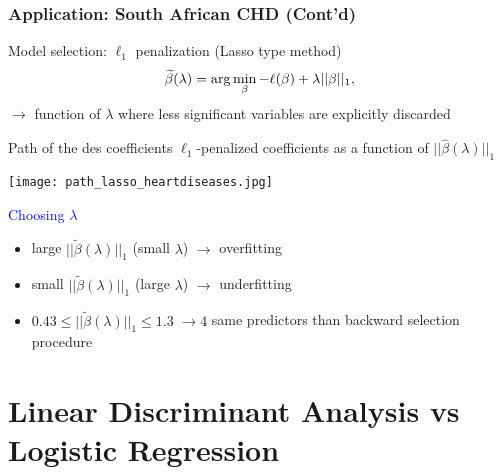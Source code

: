 \documentclass[compress, smaller, serif, 9pt]{beamer}
\begin{document}
\begin{frame}
  \frametitle{Application:  South African CHD (Cont'd)}
\begin{block}{Model selection: $\ell_1$ penalization (Lasso type method)}
\vspace{-3mm}
$$
\widetilde{\beta}(\lambda) = \arg \min_{\beta} - \ell(\beta) + \lambda || \beta ||_{1},
\vspace{-2mm}
$$
$\rightarrow$ function of $\lambda$ where less significant variables are explicitly discarded
\end{block}
\vspace{-1mm}
\begin{block}{Path of the  des coefficients $\ell_1$-penalized coefficients as a function of
$|| \hat{\beta}(\lambda) ||_{1}$}
\begin{minipage}{.65\textwidth}
\begin{center}
\texttt{[image: path\_lasso\_heartdiseases.jpg]}
\end{center}
\end{minipage}
\begin{minipage}{.33\textwidth}
\small
\textcolor{blue}{Choosing $\lambda$}
\scriptsize
\begin{center}
\begin{itemize}
   \item large $|| \widetilde{\beta}(\lambda) ||_{1}$ (small $\lambda$)  $\rightarrow$ overfitting
  \item small $|| \widetilde{\beta}(\lambda) ||_{1}$ (large $\lambda$) $\rightarrow$ underfitting
 \item $0.43 \le || \widetilde{\beta}(\lambda) ||_{1} \le 1.3$ $\rightarrow 4$
   same predictors than backward selection procedure
\end{itemize}

\end{center}
\end{minipage}
\end{block}
\end{frame}


\section{Linear Discriminant Analysis vs Logistic Regression}
\end{document}
